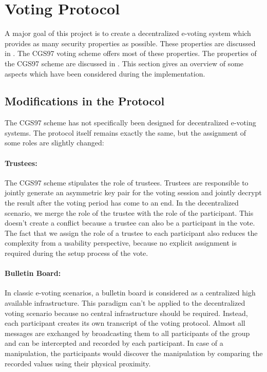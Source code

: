 \documentclass[numbers=noenddot, abstract=on, a4paper, headsepline,
footsepline, oneside, openright, draft=off, listof=leveldown]{scrreprt}
\begin{document}
\nopagebreak[2]


\section{Voting Protocol}
\label{sec:votingprotocol}
A major goal of this project is to create a decentralized e-voting system which
provides as many security properties as possible. These
properties are discussed in . The CGS97 voting scheme
\cite{CGS97} offers most of these properties. The properties of the CGS97 scheme
are discussed in . This section gives an overview of some
aspects which have been considered during the implementation.

\subsection{Modifications in the Protocol}
The CGS97 scheme has not specifically been
designed for decentralized e-voting systems. The protocol itself remains exactly
the same, but the assignment of some roles are slightly changed:

\paragraph{Trustees:} The CGS97 scheme stipulates the role of trustees. Trustees
are responsible to jointly generate an asymmetric key pair for the voting
session and jointly decrypt the result after the voting period has come to an end. In the
decentralized scenario, we merge the role of the trustee with the role of the
participant. This doesn't create a conflict because a trustee can also be a
participant in the vote. The fact that we assign the role of a trustee to each
participant also reduces the complexity from a usability perspective, because no
explicit assignment is required during the setup process of the vote.

\paragraph{Bulletin Board:} In classic e-voting scenarios, a bulletin board is
considered as a centralized high available infrastructure. This paradigm can't
be applied to the decentralized voting scenario because no central
infrastructure should be required. Instead, each participant creates its own
transcript of the voting protocol. Almost all messages are exchanged by
broadcasting them to all participants of the group and can be intercepted and
recorded by each participant. In case of a manipulation, the participants would
discover the manipulation by comparing the recorded values using their physical
proximity.
\end{document}
